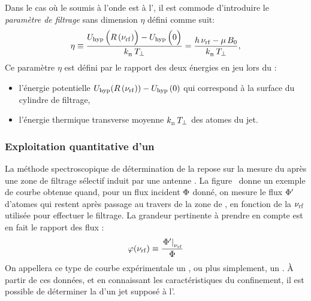 {
Dans le cas où le \jat soumis à l'onde \rf est à l'\eqthdy, il est commode d'introduire le \emph{paramètre de filtrage} sans dimension $\eta$ %
%
défini comme suit:
\begin{equation}
	\eta
	 \equiv \frac{\Uhyp\left( \larger{\Rnurf}\Rnurf \right) - \Uhyp\left( \larger{\Rnurf} 0 \right) }{\kb\,\Ttrans}
	 = \etaexpr,
	\label{eq:Eta}
\end{equation}
Ce paramètre $\eta$ est défini par le rapport des deux énergies en jeu lors du \firf :
\begin{itemize}
	\item l'énergie potentielle ${U_{\rm hyp}}({R\left( {\nu_{\rm rf}} \right)})-{U_{\rm hyp}}\left( 0 \right)$ qui correspond à la surface du cylindre de filtrage,
	\item l'énergie thermique transverse moyenne ${k_{_{\rm B}}}\,T_{\bot}$ des atomes du jet.
\end{itemize} }


		\subsubsection{Exploitation quantitative d'un \spfirf}
		La méthode spectroscopique de détermination de la \tempt repose sur la mesure du \fat après une zone de filtrage sélectif induit par une antenne \rf. 
La figure~ donne un exemple de courbe obtenue quand, pour un flux incident ${\Phi}$ donné, on mesure le flux ${{\Phi}'}$ d'atomes qui restent après passage au travers de la zone de \fisp , en fonction de la \rf ${\nu_{\rm rf}}$ utilisée pour effectuer le filtrage. La grandeur pertinente à prendre en compte est en fait le rapport des flux :%
%
\begin{equation}
	\rapflux(\nurf) \equiv \frac{\left.\fluxapres\right|_{\nurf}}{\flux}
	\label{eq:rapportflux}
\end{equation}
On appellera ce type de courbe expérimentale un \emph{\spfirf}, ou plus simplement, un \termetech{\spfi}. \`A partir de ces données, et en connaissant les caractéristiques du confinement, il est possible de déterminer la \tempt d'un jet supposé à l'\eqthdy.

\pagebreak

